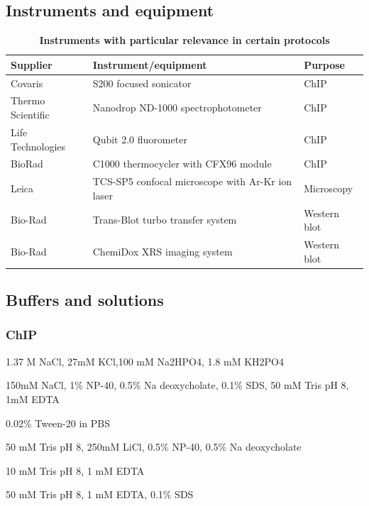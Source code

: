 \documentclass[11pt,twoside,a4paper]{report}
\begin{document}
    		\subsection{Instruments and equipment}
			\begin{table}[H]
       		\caption{\bf{Instruments with particular relevance in certain protocols}}
        		\begin{center}
            		\begin{tabular}{p{3.1cm} | p{8.5cm} | p{2.2cm}}
	               		\textbf{Supplier} & \textbf{Instrument/equipment} & \textbf{Purpose}\\
    		            \hline
						Covaris & S200 focused sonicator & ChIP\\
						Thermo Scientific & Nanodrop ND-1000 spectrophotometer & ChIP\\
						Life Technologies & Qubit 2.0 fluorometer & ChIP\\
						BioRad & C1000 thermocycler with CFX96 module & ChIP\\
						Leica & TCS-SP5 confocal microscope with Ar-Kr ion laser & Microscopy\\
						Bio-Rad & Trans-Blot turbo transfer system & Western blot\\
						Bio-Rad & ChemiDox XRS imaging system & Western blot\\
	            	\end{tabular}
    		    \end{center}
		    \end{table}
		    
		\subsection{Buffers and solutions}
			\subsubsection{ChIP}
				\begin{description}
					\footnotesize
					\item[PBS, pH 7.4] 1.37 M NaCl, 27mM KCl,100 mM Na2HPO4, 1.8 mM KH2PO4
					\item[Lysis buffer] 150mM NaCl, 1\% NP-40, 0.5\% Na deoxycholate, 0.1\% SDS, 50 mM Tris pH 8, 1mM EDTA					
					\item[PBS-T] 0.02\% Tween-20 in PBS
					\item[Lithium chloride buffer] 50 mM Tris pH 8, 250mM LiCl, 0.5\% NP-40, 0.5\% Na deoxycholate
					\item[TE buffer] 10 mM Tris pH 8, 1 mM EDTA
					\item[Elution buffer] 50 mM Tris pH 8, 1 mM EDTA, 0.1\% SDS
				\end{description}
				
\end{document}
